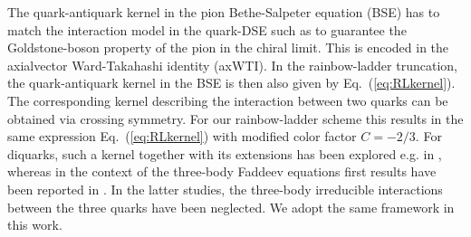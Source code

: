 The quark-antiquark kernel in the pion Bethe-Salpeter equation (BSE) has to match the interaction
model in the quark-DSE such as to guarantee the Goldstone-boson property of the pion
in the chiral limit. This is encoded in the axialvector Ward-Takahashi identity (axWTI).
In the rainbow-ladder truncation, the quark-antiquark kernel in the BSE is then also given
by Eq.~(\ref{eq:RLkernel}). The corresponding kernel describing the interaction between two
quarks can be obtained via crossing symmetry. For our rainbow-ladder scheme this results in 
the same expression Eq.~(\ref{eq:RLkernel}) with modified color factor $C=-2/3$. For diquarks,
such a kernel together with its extensions has been explored e.g. in \cite{Bender:1996bb}, whereas
in the context of the three-body Faddeev equations first results have been reported 
in \cite{Eichmann:2009qa,Eichmann:2009en,SanchisAlepuz:2011jn}. In the latter studies, the 
three-body irreducible interactions between the three quarks have been neglected. We adopt the
same framework in this work. 

